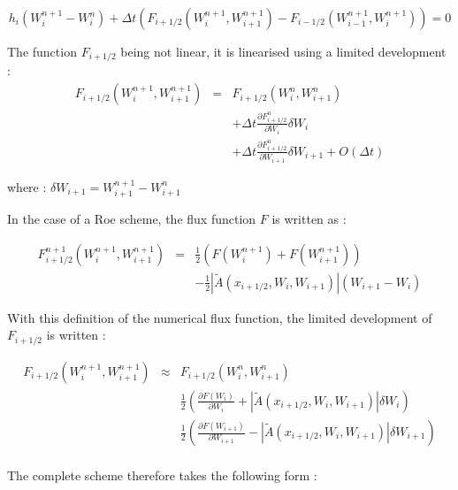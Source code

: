 \begin{equation}
 h_i (W_{i}^{n+1}-W_{i}^n) + \Delta t \left ( F_{i+1/2}(W_{i}^{n+1},W_{i+1}^{n+1})-F_{i-1/2}(W_{i-1}^{n+1},W_{i}^{n+1}) \right ) = 0
\end{equation}

The function $F_{i+1/2}$ being not linear, it is linearised using a limited development :
\begin{eqnarray}
 F_{i+1/2}(W_{i}^{n+1},W_{i+1}^{n+1}) & = & F_{i+1/2}(W_{i}^{n},W_{i+1}^{n}) \nonumber \\
                                      &   & + \Delta t \frac{\partial F_{i+1/2}^n}{\partial W_i} \delta W_i \nonumber \\
                                      &   & + \Delta t \frac{\partial F_{i+1/2}^n}{\partial W_{i+1}}\delta W_{i+1} + O(\Delta t)
\end{eqnarray}

where : $\delta W_{i+1} = W_{i+1}^{n+1} - W_{i+1}^n$

In the case of a Roe scheme, the flux function $F$ is written as :

\begin{eqnarray}
 F_{i+1/2}^{n+1}(W_{i}^{n+1},W_{i+1}^{n+1}) & = & \frac{1}{2} ( F(W_{i}^{n+1}) + F(W_{i+1}^{n+1})) \nonumber \\
                                            &   & -\frac{1}{2} |\tilde A (x_{i+1/2},W_i,W_{i+1})| (W_{i+1}-W_{i})
\end{eqnarray}

With this definition of the numerical flux function, the limited development of $F_{i+1/2}$ is written :

\begin{eqnarray}
 F_{i+1/2}(W_{i}^{n+1},W_{i+1}^{n+1}) & \approx & F_{i+1/2}(W_{i}^{n},W_{i+1}^{n}) \nonumber \\
                                      &         & \frac{1}{2} \left ( \frac{\partial F(W_i)}{\partial W_i} + |\tilde A (x_{i+1/2},W_i,W_{i+1})| \delta W_i \right ) \nonumber \\
                                      &         & \frac{1}{2} \left ( \frac{\partial F(W_{i+1})}{\partial W_{i+1}} - |\tilde A (x_{i+1/2},W_i,W_{i+1})| \delta W_{i+1} \right ) \nonumber \\
\end{eqnarray}

The complete scheme therefore takes the following form :

